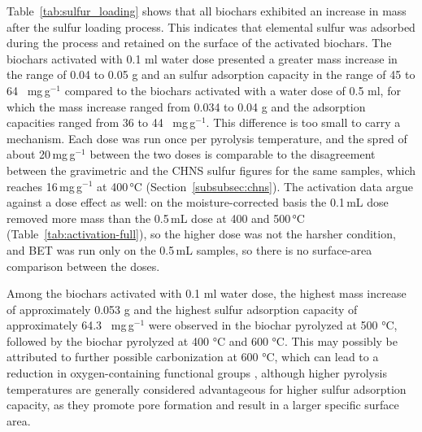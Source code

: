 Table~\ref{tab:sulfur_loading} shows that all biochars exhibited an increase in mass after the sulfur loading process. This indicates that elemental sulfur was adsorbed during the process and retained on the surface of the activated biochars. The biochars activated with 0.1 ml water dose presented a greater mass increase in the range of 0.04 to 0.05 g and an sulfur adsorption capacity in the range of 45 to 64 ~mg\,g$^{-1}$ compared to the biochars activated with a water dose of 0.5 ml, for which the mass increase ranged from 0.034 to 0.04 g and the adsorption capacities ranged from 36 to 44 ~mg\,g$^{-1}$. This difference is too small to carry a mechanism. Each dose was run once per pyrolysis temperature, and the spred of about 20\,mg\,g$^{-1}$ between the two doses is comparable to the disagreement between the gravimetric and the CHNS sulfur figures for the same samples, which reaches 16\,mg\,g$^{-1}$ at 400\,°C (Section~\ref{subsubsec:chns}). The activation data argue against a dose effect as well: on the moisture-corrected basis the 0.1\,mL dose removed more mass than the 0.5\,mL dose at 400 and 500\,°C (Table~\ref{tab:activation-full}), so the higher dose was not the harsher condition, and BET was run only on the 0.5\,mL samples, so there is no surface-area comparison between the doses.

\vspace{0.3em}

Among the biochars activated with 0.1 ml water dose, the highest mass increase of approximately 0.053 g and the highest sulfur adsorption capacity of approximately 64.3 ~mg\,g$^{-1}$ were observed in the biochar pyrolyzed at 500 °C, followed by the biochar pyrolyzed at 400 °C and 600 °C. This may possibly be attributed to further possible carbonization at 600 °C, which can lead to a reduction in oxygen-containing functional groups \cite{Sajjadi2019} \cite{tomczyk-2020}, although higher pyrolysis temperatures are generally considered advantageous for higher sulfur adsorption capacity, as they promote pore formation and result in a larger specific surface area. 

